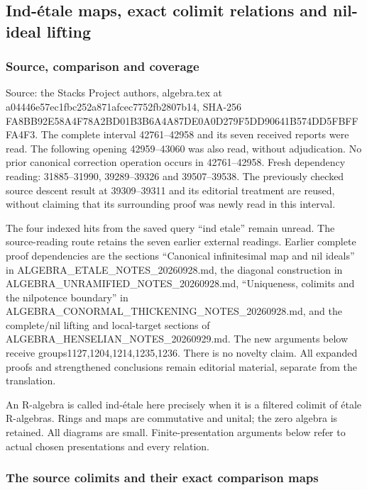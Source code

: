 \subsection{Ind-étale maps, exact colimit relations and nil-ideal lifting}\label{ind-uxe9tale-maps-exact-colimit-relations-and-nil-ideal-lifting}

\subsubsection{Source, comparison and coverage}\label{source-comparison-and-coverage}

Source: the Stacks Project authors, algebra.tex at a04446e57ec1fbc252a871afcec7752fb2807b14, SHA-256 FA8BB92E58A4F78A2BD01B3B6A4A87DE0A0D279F5DD90641B574DD5FBFFFA4F3. The complete interval 42761--42958 and its seven received reports were read. The following opening 42959--43060 was also read, without adjudication. No prior canonical correction operation occurs in 42761--42958. Fresh dependency reading: 31885--31990, 39289--39326 and 39507--39538. The previously checked source descent result at 39309--39311 and its editorial treatment are reused, without claiming that its surrounding proof was newly read in this interval.

The four indexed hits from the saved query ``ind etale'' remain unread. The source-reading route retains the seven earlier external readings. Earlier complete proof dependencies are the sections ``Canonical infinitesimal map and nil ideals'' in ALGEBRA\_ETALE\_NOTES\_20260928.md, the diagonal construction in ALGEBRA\_UNRAMIFIED\_NOTES\_20260928.md, ``Uniqueness, colimits and the nilpotence boundary'' in ALGEBRA\_CONORMAL\_THICKENING\_NOTES\_20260928.md, and the complete/nil lifting and local-target sections of ALGEBRA\_HENSELIAN\_NOTES\_20260929.md. The new arguments below receive groups1127,1204,1214,1235,1236. There is no novelty claim. All expanded proofs and strengthened conclusions remain editorial material, separate from the translation.

An R-algebra is called ind-étale here precisely when it is a filtered colimit of étale R-algebras. Rings and maps are commutative and unital; the zero algebra is retained. All diagrams are small. Finite-presentation arguments below refer to actual chosen presentations and every relation.

\subsubsection{The source colimits and their exact comparison maps}\label{the-source-colimits-and-their-exact-comparison-maps}

